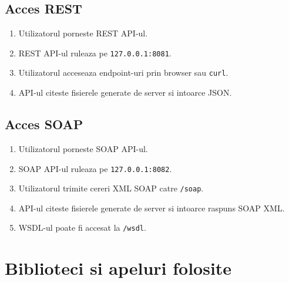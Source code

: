 \documentclass[12pt,a4paper]{article}
\begin{document}
\subsection{Acces REST}

\begin{enumerate}
    \item Utilizatorul porneste REST API-ul.
    \item REST API-ul ruleaza pe \texttt{127.0.0.1:8081}.
    \item Utilizatorul acceseaza endpoint-uri prin browser sau \texttt{curl}.
    \item API-ul citeste fisierele generate de server si intoarce JSON.
\end{enumerate}

\subsection{Acces SOAP}

\begin{enumerate}
    \item Utilizatorul porneste SOAP API-ul.
    \item SOAP API-ul ruleaza pe \texttt{127.0.0.1:8082}.
    \item Utilizatorul trimite cereri XML SOAP catre \texttt{/soap}.
    \item API-ul citeste fisierele generate de server si intoarce raspuns SOAP XML.
    \item WSDL-ul poate fi accesat la \texttt{/wsdl}.
\end{enumerate}

\section{Biblioteci si apeluri folosite}
\end{document}
